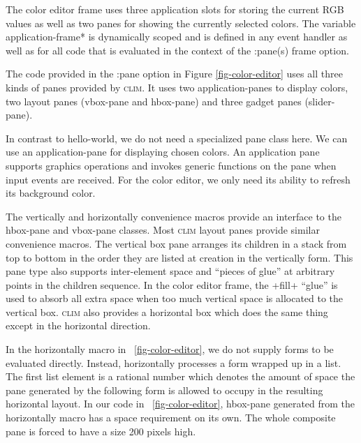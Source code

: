 \documentclass[twocolumn,a4paper]{article}
\newcommand {\code}[1]{{\sffamily #1}}
\newcommand {\CLIM}{\textsc{clim}}
\let\class\code
\let\method\code
\let\constant\code
\let\variable\code
\let\macro\code
\let\keyword\code
\begin{document}
The color editor frame uses three application slots for storing the
current RGB values as well as two panes for showing the currently
selected colors. The variable \variable{*application-frame*} is
dynamically scoped and is defined in any event handler as well as for
all code that is evaluated in the context of the \keyword{:pane(s)}
frame option.

\begin{figure*} \lstset{style=framestyle}

\caption{Color Editor}\label{fig-color-editor}
\end{figure*}

The code provided in the \keyword{:pane} option in Figure
\ref{fig-color-editor} uses all three kinds of panes provided by
\CLIM{}. It uses two application-panes to display colors, two layout
panes (\class{vbox-pane} and \class{hbox-pane}) and three gadget panes
(\class{slider-pane}).

In contrast to \class{hello-world}, we do not need a specialized pane
class here. We can use an application-pane for displaying chosen
colors.  An application pane supports graphics operations and invokes
generic functions on the pane when input events are received. For the
color editor, we only need its ability to refresh its background
color.

The \macro{vertically} and \macro{horizontally} convenience macros
provide an interface to the \class{hbox-pane} and \class{vbox-pane}
classes. Most \CLIM{} layout panes provide similar convenience
macros. The vertical box pane arranges its children in a stack from
top to bottom in the order they are listed at creation in the
vertically form. This pane type also supports inter-element space and
``pieces of glue'' at arbitrary points in the children sequence. In
the color editor frame, the \constant{+fill+} ``glue'' is used to
absorb all extra space when too much vertical space is allocated to
the vertical box. \CLIM{} also provides a horizontal box which does
the same thing except in the horizontal direction.

In the \macro{horizontally} macro in
\figurename~\ref{fig-color-editor}, we do not supply forms to be
evaluated directly. Instead, \method{horizontally} processes a form
wrapped up in a list. The first list element is a rational number
which denotes the amount of space the pane generated by the following
form is allowed to occupy in the resulting horizontal layout. In our
code in \figurename~\ref{fig-color-editor}, \class{hbox-pane}
generated from the \macro{horizontally} macro has a space requirement
on its own. The whole composite pane is forced to have a size 200
pixels high.
\end{document}
